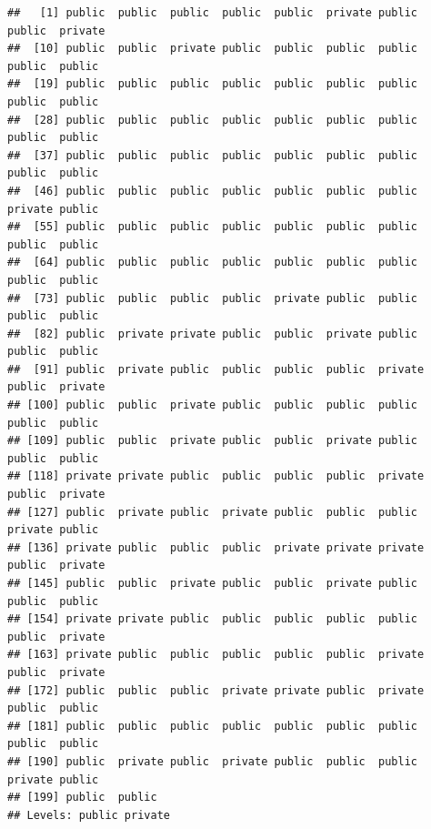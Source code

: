 \documentclass[
]{book}
\newenvironment{Shaded}{\begin{snugshade}}{\end{snugshade}}
\newcommand{\AttributeTok}[1]{\textcolor[rgb]{0.77,0.63,0.00}{#1}}
\newcommand{\ConstantTok}[1]{\textcolor[rgb]{0.00,0.00,0.00}{#1}}
\newcommand{\DecValTok}[1]{\textcolor[rgb]{0.00,0.00,0.81}{#1}}
\newcommand{\FunctionTok}[1]{\textcolor[rgb]{0.00,0.00,0.00}{#1}}
\newcommand{\NormalTok}[1]{#1}
\newcommand{\OtherTok}[1]{\textcolor[rgb]{0.56,0.35,0.01}{#1}}
\newcommand{\SpecialCharTok}[1]{\textcolor[rgb]{0.00,0.00,0.00}{#1}}
\begin{document}
\begin{Shaded}
\end{Shaded}

\begin{verbatim}
##   [1] public  public  public  public  public  private public  public  private
##  [10] public  public  private public  public  public  public  public  public 
##  [19] public  public  public  public  public  public  public  public  public 
##  [28] public  public  public  public  public  public  public  public  public 
##  [37] public  public  public  public  public  public  public  public  public 
##  [46] public  public  public  public  public  public  public  private public 
##  [55] public  public  public  public  public  public  public  public  public 
##  [64] public  public  public  public  public  public  public  public  public 
##  [73] public  public  public  public  private public  public  public  public 
##  [82] public  private private public  public  private public  public  public 
##  [91] public  private public  public  public  public  private public  private
## [100] public  public  private public  public  public  public  public  public 
## [109] public  public  private public  public  private public  public  public 
## [118] private private public  public  public  public  private public  private
## [127] public  private public  private public  public  public  private public 
## [136] private public  public  public  private private private public  private
## [145] public  public  private public  public  private public  public  public 
## [154] private private public  public  public  public  public  public  private
## [163] private public  public  public  public  public  private public  private
## [172] public  public  public  private private public  private public  public 
## [181] public  public  public  public  public  public  public  public  public 
## [190] public  private public  private public  public  public  private public 
## [199] public  public 
## Levels: public private
\end{verbatim}
\end{document}
